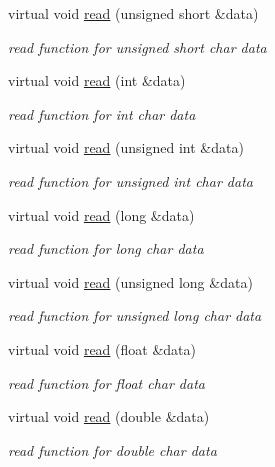 \begin{DoxyCompactItemize}
virtual void \hyperlink{class_i_dream_sky_1_1_input_stream_a52b36dfa371d294d3909e6e95f0f5f2e}{read} (unsigned short \&data)
\begin{DoxyCompactList}\small\item\em read function for unsigned short char data \end{DoxyCompactList}\item 
virtual void \hyperlink{class_i_dream_sky_1_1_input_stream_a16a7d16c2f51b3faf13f86f32cd3e270}{read} (int \&data)
\begin{DoxyCompactList}\small\item\em read function for int char data \end{DoxyCompactList}\item 
virtual void \hyperlink{class_i_dream_sky_1_1_input_stream_a152c62d9b82bcf884890cca238abadbb}{read} (unsigned int \&data)
\begin{DoxyCompactList}\small\item\em read function for unsigned int char data \end{DoxyCompactList}\item 
virtual void \hyperlink{class_i_dream_sky_1_1_input_stream_a84479e2001dff1fc51995160016e8be3}{read} (long \&data)
\begin{DoxyCompactList}\small\item\em read function for long char data \end{DoxyCompactList}\item 
virtual void \hyperlink{class_i_dream_sky_1_1_input_stream_a6b1584f2a210b0840438261b0bd3d62c}{read} (unsigned long \&data)
\begin{DoxyCompactList}\small\item\em read function for unsigned long char data \end{DoxyCompactList}\item 
virtual void \hyperlink{class_i_dream_sky_1_1_input_stream_a38fbf71a866a48705f5eaa189307c5d3}{read} (float \&data)
\begin{DoxyCompactList}\small\item\em read function for float char data \end{DoxyCompactList}\item 
virtual void \hyperlink{class_i_dream_sky_1_1_input_stream_aa040912555e5c5216569a5bbe95523f1}{read} (double \&data)
\begin{DoxyCompactList}\small\item\em read function for double char data \end{DoxyCompactList}\item 

\end{DoxyCompactItemize}
